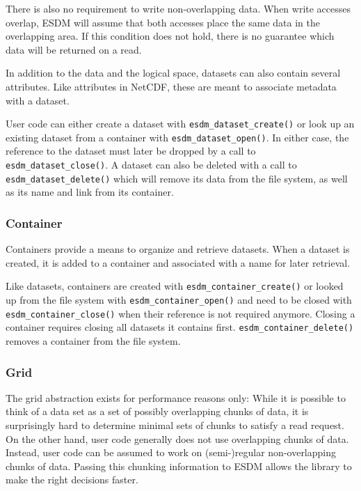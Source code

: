 There is also no requirement to write non-overlapping data. 
When write accesses overlap, ESDM will assume that both accesses place the same data in the overlapping area. 
If this condition does not hold, there is no guarantee which data will be returned on a read.

In addition to the data and the logical space, datasets can also contain several attributes. 
Like attributes in NetCDF, these are meant to associate metadata with a dataset.

User code can either create a dataset with \lstinline|esdm_dataset_create()| or look up an existing dataset from a container with \lstinline|esdm_dataset_open()|. 
In either case, the reference to the dataset must later be dropped by a call to \lstinline|esdm_dataset_close()|. 
A dataset can also be deleted with a call to \lstinline|esdm_dataset_delete()| which will remove its data from the file system, as well as its name and link from its container.

\subsubsection{Container}%
\label{sec:user-guides:container}

Containers provide a means to organize and retrieve datasets. 
When a dataset is created, it is added to a container and associated with a name for later retrieval.

Like datasets, containers are created with \lstinline|esdm_container_create()| or looked up from the file system with \lstinline|esdm_container_open()| and need to be closed with \lstinline|esdm_container_close()| when their reference is not required anymore.
Closing a container requires closing all datasets it contains first. 
\lstinline|esdm_container_delete()| removes a container from the file system.

\subsubsection{Grid}%
\label{sec:user-guides:grid}

The grid abstraction exists for performance reasons only: While it is possible to think of a data set as a set of possibly overlapping chunks of data, it is surprisingly hard to determine minimal sets of chunks to satisfy a read request. 
On the other hand, user code generally does not use overlapping chunks of data. 
Instead, user code can be assumed to work on (semi-)regular non-overlapping chunks of data. 
Passing this chunking information to ESDM allows the library to make the right decisions faster.

